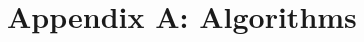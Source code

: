 \documentclass[11pt]{article}
\newtheorem{mydef}{Definition}
\begin{document}
%










\newpage

\section{Appendix A: Algorithms}
\end{document}
